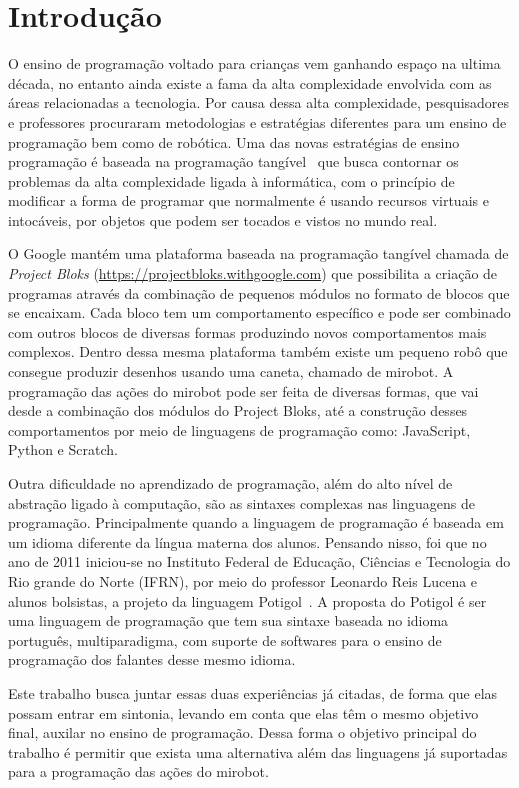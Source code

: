 \chapter{Introdução}
\label{cap:introducao}

O ensino de programação voltado para crianças vem ganhando espaço na ultima década\cite{Gordon}, no entanto ainda existe a fama da
alta complexidade envolvida com as áreas relacionadas a tecnologia. Por causa dessa alta
complexidade, pesquisadores e professores procuraram metodologias e
estratégias diferentes para um ensino de programação bem como de robótica.
Uma das novas estratégias de ensino programação é baseada na
programação tangível~\cite{Horn2007} que busca contornar os problemas da alta complexidade ligada à informática, com o princípio de modificar a forma de programar que
normalmente é usando recursos virtuais e intocáveis, por objetos que podem ser
tocados e vistos no mundo real.


O Google mantém uma plataforma baseada na programação tangível chamada de \textit{Project Bloks} (\url{https://projectbloks.withgoogle.com}) 
que possibilita a criação de programas através da
combinação de pequenos módulos no formato de blocos que se encaixam. 
Cada bloco tem um comportamento específico e pode ser combinado com outros blocos de diversas formas
produzindo novos comportamentos mais complexos.
Dentro dessa mesma plataforma também existe um pequeno robô que consegue produzir desenhos usando uma caneta, chamado de mirobot. A programação das ações do mirobot pode ser feita de diversas formas, que vai desde a combinação dos módulos do Project Bloks, até a construção
desses comportamentos por meio de linguagens de programação como: JavaScript,
Python e Scratch.

Outra dificuldade no aprendizado de programação, além do alto nível de
abstração ligado à computação, são as sintaxes complexas nas linguagens
de programação. Principalmente quando a linguagem de programação é baseada em um
idioma diferente da língua materna dos alunos. Pensando nisso, foi que no ano de
2011 iniciou-se no Instituto Federal de Educação, Ciências e Tecnologia do Rio
grande do Norte (IFRN), por meio do professor Leonardo Reis Lucena e alunos
bolsistas, a projeto da linguagem Potigol~\cite{potigol}. A proposta do Potigol é ser uma
linguagem de programação que tem sua sintaxe baseada no idioma português, multiparadigma, com suporte de softwares para o ensino de programação dos falantes desse mesmo idioma.

Este trabalho busca juntar essas duas experiências já citadas, de forma que
elas possam entrar em sintonia, levando em
conta que elas têm o mesmo objetivo final, auxilar no ensino de programação. 
Dessa forma o objetivo principal do
trabalho é permitir que exista uma alternativa além das linguagens já
suportadas para a programação das ações do mirobot.

